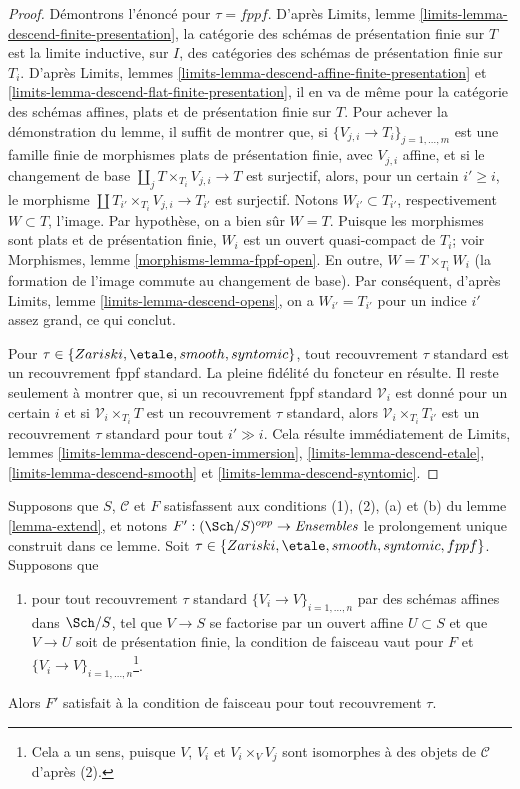 \begin{proof}
Démontrons l'énoncé pour $\tau = fppf$.
D'après Limits, lemme \ref{limits-lemma-descend-finite-presentation},
la catégorie des schémas de présentation finie sur $T$ est la
limite inductive, sur $I$, des catégories des schémas de présentation finie sur $T_i$. D'après
Limits, lemmes \ref{limits-lemma-descend-affine-finite-presentation}
et \ref{limits-lemma-descend-flat-finite-presentation},
il en va de même pour la catégorie des schémas affines, plats et
de présentation finie sur $T$.
Pour achever la démonstration du lemme, il suffit de montrer que, si
$\{V_{j, i} \to T_i\}_{j = 1, \ldots, m}$ est une famille finie de
morphismes plats de présentation finie, avec $V_{j, i}$ affine, et si le
changement de base $\coprod_j T \times_{T_i} V_{j, i} \to T$ est surjectif,
alors, pour un certain $i' \geq i$, le morphisme
$\coprod T_{i'} \times_{T_i} V_{j, i} \to T_{i'}$ est surjectif.
Notons $W_{i'} \subset T_{i'}$, respectivement $W \subset T$, l'image.
Par hypothèse, on a bien sûr $W = T$.
Puisque les morphismes sont plats et de présentation finie,
$W_i$ est un ouvert quasi-compact de $T_i$; voir
Morphismes, lemme \ref{morphisms-lemma-fppf-open}.
En outre, $W = T \times_{T_i} W_i$ (la formation de l'image commute
au changement de base). Par conséquent, d'après
Limits, lemme \ref{limits-lemma-descend-opens},
on a $W_{i'} = T_{i'}$ pour un indice $i'$ assez grand,
ce qui conclut.

\medskip\noindent
Pour $\tau \in \{Zariski, \etale, smooth, syntomic\}$, tout recouvrement $\tau$ standard
est un recouvrement fppf standard. La pleine fidélité du foncteur
en résulte. Il reste seulement à montrer que, si un recouvrement fppf standard
$\mathcal{V}_i$ est donné pour un certain $i$ et si $\mathcal{V}_i \times_{T_i} T$
est un recouvrement $\tau$ standard, alors $\mathcal{V}_i \times_{T_i} T_{i'}$
est un recouvrement $\tau$ standard pour tout $i' \gg i$. Cela résulte immédiatement
de Limits, lemmes
\ref{limits-lemma-descend-open-immersion},
\ref{limits-lemma-descend-etale},
\ref{limits-lemma-descend-smooth} et
\ref{limits-lemma-descend-syntomic}.
\end{proof}

\begin{lemma}
\label{lemma-extend-sheaf-general}
Supposons que $S$, $\mathcal{C}$ et $F$ satisfassent aux conditions (1), (2), (a) et (b) du
lemme \ref{lemma-extend}, et notons $F' : (\Sch/S)^{opp} \to \textit{Ensembles}$
le prolongement unique construit dans ce lemme. Soit
$\tau \in \{Zariski, \etale, smooth, syntomic, fppf\}$. Supposons que
\begin{enumerate}
\item[(c)] pour tout recouvrement $\tau$ standard $\{V_i \to V\}_{i = 1, \ldots, n}$
par des schémas affines dans $\Sch/S$, tel que $V \to S$ se factorise par un ouvert affine
$U \subset S$ et que $V \to U$ soit de présentation finie, la condition de faisceau
vaut pour $F$ et $\{V_i \to V\}_{i = 1, \ldots, n}$\footnote{Cela a
un sens, puisque $V$, $V_i$ et $V_i \times_V V_j$ sont isomorphes à des objets
de $\mathcal{C}$ d'après (2).}.
\end{enumerate}
Alors $F'$ satisfait à la condition de faisceau pour tout recouvrement $\tau$.
\end{lemma}

